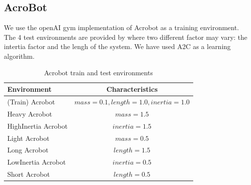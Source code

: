 \subsection{AcroBot}
\label{subsec:acrobot}

We use the openAI gym implementation of Acrobot as a training environment. The 4 test environments are provided by \cite{PackerGao:1810.12282} where two different factor may vary: the intertia factor and the lengh of the system. We have used A2C as a learning algorithm.


\begin{table}[h!]
\begin{center}
\begin{tabular}{l|c} \toprule
\textbf{Environment} & \textbf{Characteristics} \\ \hline
(Train) Acrobot & $mass=0.1, length=1.0 ,inertia=1.0$ \\ \hline
Heavy Acrobot  & $mass=1.5$ \\
HighInertia Acrobot  &  $inertia=1.5$ \\
Light Acrobot  & $mass=0.5$\\
Long Acrobot  & $length=1.5$ \\
LowInertia Acrobot  & $inertia=0.5$ \\
Short Acrobot  &  $length=0.5$\\
\hline
\end{tabular}
\end{center}
\caption{Acrobot train and test environments}
\end{table}



